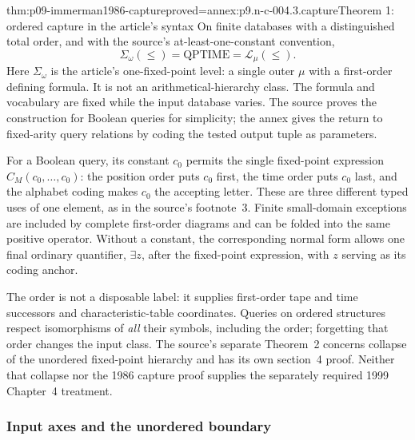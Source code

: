 \begin{hbtheorem}{thm:p09-immerman1986-capture}{proved=annex:p9.n-c-004.3.capture}{Theorem 1: ordered capture in the article's syntax}
On finite databases with a distinguished total order, and with the
source's at-least-one-constant convention,
\[
 \Sigma_\omega(\leq)=\mathrm{QPTIME}=\mathcal L_\mu(\leq).
\]
Here \(\Sigma_\omega\) is the article's one-fixed-point level:
a single outer \(\mu\) with a first-order defining formula.  It is
not an arithmetical-hierarchy class.  The formula and vocabulary are fixed
while the input database varies.  The source proves the construction for
Boolean queries for simplicity; the annex gives the return to fixed-arity
query relations by coding the tested output tuple as parameters.

For a Boolean query, its constant \(c_0\) permits the single fixed-point
expression \(C_M(c_0,\ldots,c_0)\): the position order puts \(c_0\)
first, the time order puts \(c_0\) last, and the alphabet coding makes
\(c_0\) the accepting letter.  These are three different typed uses of
one element, as in the source's footnote~3.  Finite small-domain exceptions
are included by complete first-order diagrams and can be folded into the
same positive operator.  Without a constant, the corresponding normal
form allows one final ordinary quantifier, \(\exists z\), after the
fixed-point expression, with \(z\) serving as its coding anchor.
\end{hbtheorem}

The order is not a disposable label: it supplies first-order tape and time
successors and characteristic-table coordinates.  Queries on ordered
structures respect isomorphisms of \emph{all} their symbols, including
the order; forgetting that order changes the input class.  The source's
separate Theorem~2 concerns collapse of the unordered fixed-point hierarchy
and has its own section~4 proof.  Neither that collapse nor the 1986
capture proof supplies the separately required 1999 Chapter~4 treatment.

\subsubsection{Input axes and the unordered boundary}

